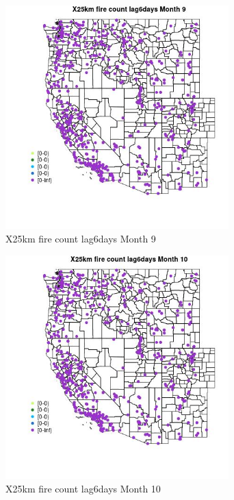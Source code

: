 \begin{figure} 
\centering  
\includegraphics[width=0.77\textwidth]{Code_Outputs/Report_ML_input_PM25_Step4_part_e_de_duplicated_aves_compiled_2019-05-14wNAs_MapObsMo9X25km_fire_count_lag6days.jpg} 
\caption{\label{fig:Report_ML_input_PM25_Step4_part_e_de_duplicated_aves_compiled_2019-05-14wNAsMapObsMo9X25km_fire_count_lag6days}X25km fire count lag6days Month 9} 
\end{figure} 
 

\begin{figure} 
\centering  
\includegraphics[width=0.77\textwidth]{Code_Outputs/Report_ML_input_PM25_Step4_part_e_de_duplicated_aves_compiled_2019-05-14wNAs_MapObsMo10X25km_fire_count_lag6days.jpg} 
\caption{\label{fig:Report_ML_input_PM25_Step4_part_e_de_duplicated_aves_compiled_2019-05-14wNAsMapObsMo10X25km_fire_count_lag6days}X25km fire count lag6days Month 10} 
\end{figure} 
 

